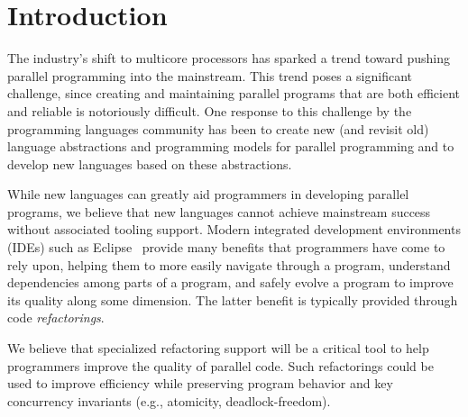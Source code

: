 \section{Introduction}

The industry's shift to multicore processors has sparked a trend
toward pushing parallel programming into the mainstream.  This trend
poses a significant challenge, since creating and maintaining parallel
programs that are both efficient and reliable is notoriously
difficult.  One response to this challenge
by the programming languages community has been to create new (and
revisit old) language
abstractions and programming models 
for parallel programming and to
develop new languages based on these abstractions.  %

While new languages can greatly aid programmers in developing 
parallel programs, we believe that new languages cannot
achieve mainstream success without associated tooling support.
Modern integrated development environments
(IDEs) such as Eclipse~\cite{eclipse} provide many benefits that programmers
have come to rely upon, helping
them to more easily navigate through a program, understand
dependencies among parts of a program, and safely evolve a program to
improve its quality along some dimension.  The latter benefit is typically
provided through code {\em refactorings}.  

We believe that
specialized refactoring support will be a critical tool to help programmers improve the
quality of parallel code.  Such refactorings could be used
to improve efficiency while preserving program behavior and key
concurrency invariants (e.g., atomicity, deadlock-freedom).

